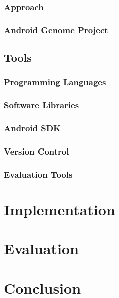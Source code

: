 \documentclass[12pt,twoside,notitlepage]{report}
\begin{document}
\subsection{Approach}

\subsection{Android Genome Project}

\section{Tools}

\subsection{Programming Languages}

\subsection{Software Libraries}

\subsection{Android SDK}

\subsection{Version Control}

\subsection{Evaluation Tools}

\cleardoublepage
\chapter{Implementation}

\label{section:Code_Pseudoinstructions}


\cleardoublepage
\chapter{Evaluation}


\cleardoublepage
\chapter{Conclusion}
\end{document}
